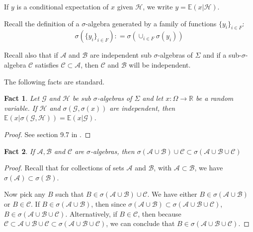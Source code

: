 \documentclass[12pt]{ectaart}
\newcommand{\1}{\mathbbm 1}
\theoremstyle{plain}
\newtheorem{fact}{Fact}[section]
\theoremstyle{definition}
\begin{document}
If $y$ is a conditional expectation of $x$ given $\mathcal{H}$, we write $ y= \mathbb{E}(x\vert \mathcal{H})$.


Recall the definition of a $\sigma$-algebra generated by a family of functions $\{y_{i}\}_{i\in F}$: \[\sigma(\{y_{i}\}_{i\in F}) \colon = \sigma(\cup_{i\in F}\sigma(y_{i}))\]

Recall also that if  $\mathcal{A}$ and $\mathcal{B}$ are independent sub $\sigma$-algebras of $\Sigma$ and if a sub-$\sigma$-algebra $\mathcal{C}$ satisfies $\mathcal{C}\subset \mathcal{A}$, then $\mathcal{C}$ and $\mathcal{B}$ will be independent.


The following facts are standard. 

\begin{fact}\label{fact: indepex}
	Let $\mathcal{G}$ and $\mathcal{H}$ be sub $\sigma$-algebras of $\Sigma$ and let $x\colon \Omega \rightarrow \mathbb{R}$ be a random variable. If $\mathcal{H}$ and $\sigma(\mathcal{G},\sigma(x))$ are independent, then $\mathbb{E}(x\vert \sigma(\mathcal{G},\mathcal{H}))= \mathbb{E}(x\vert \mathcal{G})$.
\end{fact}
\begin{proof}
	See section 9.7 in \cite{Williams1991}.
\end{proof}

\begin{fact}\label{clm: sigmaalg1}
	If $\mathcal{A},\mathcal{B}$ and $\mathcal{C}$ are $\sigma$-algebras, then $\sigma(\mathcal{A}\cup \mathcal{B})\cup \mathcal{C} \subset \sigma(\mathcal{A}\cup \mathcal{B}\cup \mathcal{C})$
\end{fact}

\begin{proof}
	
	Recall that for collections of sets $\mathcal{A}$ and $\mathcal{B}$, with $\mathcal{A}\subset \mathcal{B}$, we have $\sigma(\mathcal{A})\subset \sigma(\mathcal{B})$. 
	
	Now pick any $B$ such that $B\in \sigma(\mathcal{A}\cup \mathcal{B})\cup \mathcal{C}$. We have either $B\in \sigma(\mathcal{A}\cup \mathcal{B})$ or $B\in \mathcal{C}$. If $B\in \sigma(\mathcal{A}\cup \mathcal{B})$, then since $\sigma(\mathcal{A}\cup \mathcal{B})\subset \sigma(\mathcal{A}\cup \mathcal{B}\cup \mathcal{C})$, $B\in \sigma(\mathcal{A}\cup \mathcal{B}\cup\mathcal{C})$. Alternatively, if $B\in \mathcal{C}$, then because $\mathcal{C}\subset \mathcal{A}\cup\mathcal{B}\cup \mathcal{C}\subset \sigma(\mathcal{A}\cup\mathcal{B}\cup\mathcal{C})$, we can conclude that $B\in \sigma(\mathcal{A}\cup \mathcal{B}\cup\mathcal{C})$. 
\end{proof}
\end{document}
